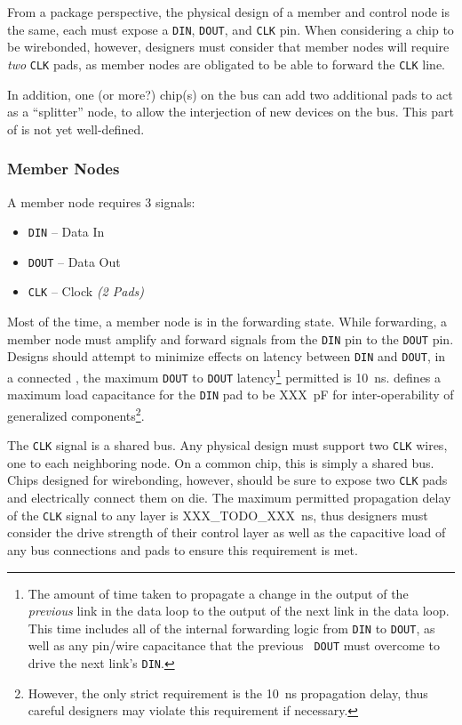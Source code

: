 From a package perspective, the physical design of a member and control node
is the same, each must expose a {\tt DIN}, {\tt DOUT}, and {\tt CLK} pin. When
considering a chip to be wirebonded, however, designers must consider that
member nodes will require {\em two} {\tt CLK} pads, as member nodes are
obligated to be able to forward the {\tt CLK} line.

In addition, one (or more?) chip(s) on the bus can add two additional pads to
act as a ``splitter'' node, to allow the interjection of new devices on the
bus. This part of \bus is not yet well-defined.

\subsubsection{Member Nodes}
\label{sec:physical-member}
A member node requires 3 signals:

\begin{itemize}
  \item {\tt DIN} -- Data In
  \item {\tt DOUT} -- Data Out
  \item {\tt CLK} -- Clock {\em (2 Pads)}
\end{itemize}

Most of the time, a member node is in the {\sc forwarding} state. While
forwarding, a member node must amplify and forward signals from the {\tt DIN}
pin to the {\tt DOUT} pin. Designs should attempt to minimize effects on
latency between {\tt DIN} and {\tt DOUT}, in a connected \bus, the maximum
{\tt DOUT} to {\tt DOUT} latency\footnote{
  The amount of time taken to propagate a change in the output of the {\em
  previous} link in the data loop to the output of the next link in the data
  loop. This time includes all of the internal forwarding logic from {\tt DIN}
  to {\tt DOUT}, as well as any pin/wire capacitance that the previous {\tt
  DOUT} must overcome to drive the next link's {\tt DIN}.}
permitted is 10~ns. \bus defines a maximum load capacitance for the {\tt DIN}
pad to be XXX~pF for inter-operability of generalized components\footnote{
  However, the only strict requirement is the 10~ns propagation delay, thus
  careful designers may violate this requirement if necessary.}.

The {\tt CLK} signal is a shared bus. Any physical design must support two
{\tt CLK} wires, one to each neighboring node. On a common chip, this is
simply a shared bus. Chips designed for wirebonding, however, should be sure
to expose two {\tt CLK} pads and electrically connect them on die. The maximum
permitted propagation delay of the {\tt CLK} signal to any layer is
XXX\_TODO\_XXX~ns, thus designers must consider the drive strength of their
control layer as well as the capacitive load of any bus connections and pads
to ensure this requirement is met.

